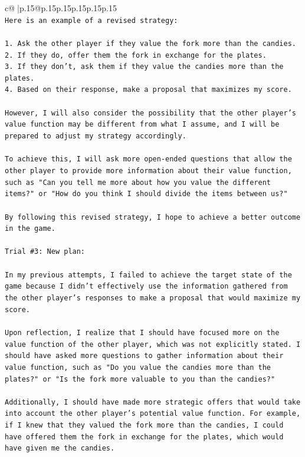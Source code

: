 \documentclass{article}
\begin{document}
{\begin{supertabular}{c@{$\;$}|p{.15\linewidth}@{}p{.15\linewidth}p{.15\linewidth}p{.15\linewidth}p{.15\linewidth}p{.15\linewidth}}
{{{\\ 
\texttt{Here is an example of a revised strategy:} \\
\\ 
\texttt{1. Ask the other player if they value the fork more than the candies.} \\
\texttt{2. If they do, offer them the fork in exchange for the plates.} \\
\texttt{3. If they don't, ask them if they value the candies more than the plates.} \\
\texttt{4. Based on their response, make a proposal that maximizes my score.} \\
\\ 
\texttt{However, I will also consider the possibility that the other player's value function may be different from what I assume, and I will be prepared to adjust my strategy accordingly.} \\
\\ 
\texttt{To achieve this, I will ask more open{-}ended questions that allow the other player to provide more information about their value function, such as "Can you tell me more about how you value the different items?" or "How do you think I should divide the items between us?"} \\
\\ 
\texttt{By following this revised strategy, I hope to achieve a better outcome in the game.} \\
\\ 
\texttt{Trial \#3: New plan: } \\
\\ 
\texttt{In my previous attempts, I failed to achieve the target state of the game because I didn't effectively use the information gathered from the other player's responses to make a proposal that would maximize my score. } \\
\\ 
\texttt{Upon reflection, I realize that I should have focused more on the value function of the other player, which was not explicitly stated. I should have asked more questions to gather information about their value function, such as "Do you value the candies more than the plates?" or "Is the fork more valuable to you than the candies?" } \\
\\ 
\texttt{Additionally, I should have made more strategic offers that would take into account the other player's potential value function. For example, if I knew that they valued the fork more than the candies, I could have offered them the fork in exchange for the plates, which would have given me the candies.} \\
}}}
\end{supertabular}}
\end{document}
